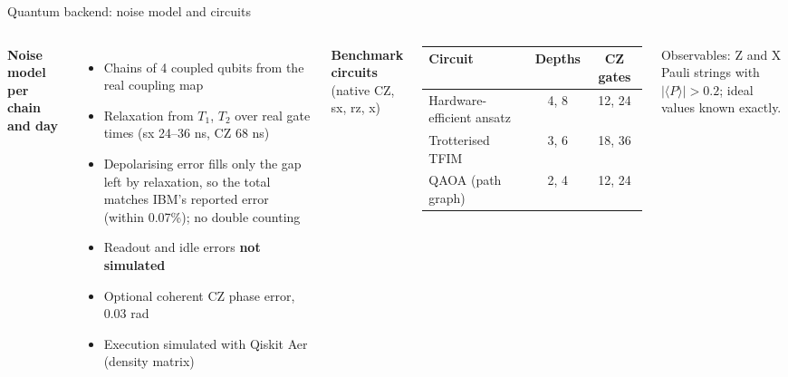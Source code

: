 \documentclass[aspectratio=169,11pt]{beamer}
\begin{document}
\begin{frame}{Quantum backend: noise model and circuits}
\footnotesize
\begin{columns}[T]
\textbf{Noise model per chain and day}
\begin{itemize}
\item Chains of 4 coupled qubits from the real coupling map
\item Relaxation from $T_1$, $T_2$ over real gate times (sx 24--36 ns, CZ 68 ns)
\item Depolarising error fills only the gap left by relaxation, so the total matches IBM's reported error (within 0.07\%); no double counting
\item Readout and idle errors \textbf{not simulated}
\item Optional coherent CZ phase error, 0.03 rad
\item Execution simulated with Qiskit Aer (density matrix)
\end{itemize}
\textbf{Benchmark circuits} (native CZ, sx, rz, x)
\begin{table}\scriptsize
\begin{tabular}{lcc}
\toprule
Circuit & Depths & CZ gates \\
\midrule
Hardware-efficient ansatz & 4, 8 & 12, 24 \\
Trotterised TFIM & 3, 6 & 18, 36 \\
QAOA (path graph) & 2, 4 & 12, 24 \\
\bottomrule
\end{tabular}
\end{table}
Observables: Z and X Pauli strings with $|\langle P\rangle| > 0.2$; ideal values known exactly.
\end{columns}
\end{frame}
\end{document}

